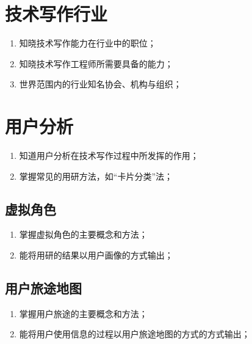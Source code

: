 \documentclass[letterpaper,10pt,english]{sphinxmanual}
\begin{document}
\section{技术写作行业}
\label{\detokenize{about/tw-comp-model:id2}}\begin{enumerate}
%
\item {} 
\sphinxAtStartPar
知晓技术写作能力在行业中的职位；

\item {} 
\sphinxAtStartPar
知晓技术写作工程师所需要具备的能力；

\item {} 
\sphinxAtStartPar
世界范围内的行业知名协会、机构与组织；

\end{enumerate}


\section{用户分析}
\label{\detokenize{about/tw-comp-model:id3}}\begin{enumerate}
%
\item {} 
\sphinxAtStartPar
知道用户分析在技术写作过程中所发挥的作用；

\item {} 
\sphinxAtStartPar
掌握常见的用研方法，如“卡片分类”法；

\end{enumerate}


\subsection{虚拟角色}
\label{\detokenize{about/tw-comp-model:id4}}\begin{enumerate}
%
\item {} 
\sphinxAtStartPar
掌握虚拟角色的主要概念和方法；

\item {} 
\sphinxAtStartPar
能将用研的结果以用户画像的方式输出；

\end{enumerate}


\subsection{用户旅途地图}
\label{\detokenize{about/tw-comp-model:id5}}\begin{enumerate}
%
\item {} 
\sphinxAtStartPar
掌握用户旅途的主要概念和方法；

\item {} 
\sphinxAtStartPar
能将用户使用信息的过程以用户旅途地图的方式的方式输出；

\end{enumerate}
\end{document}
